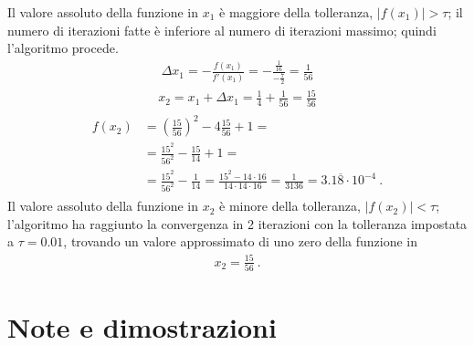 \documentclass[letterpaper,10pt,italian]{jupyterBook}
\begin{document}
\sphinxAtStartPar
Il valore assoluto della funzione in \(x_1\) è maggiore della tolleranza, \(|f(x_1)| > \tau\); il numero di iterazioni fatte è inferiore al numero di iterazioni massimo; quindi l’algoritmo procede.
\begin{equation*}
\begin{split}\Delta x_1 = - \frac{f(x_1)}{f'(x_1)} = -\frac{\frac{1}{16}}{-\frac{7}{2}} = \frac{1}{56}\end{split}
\end{equation*}\begin{equation*}
\begin{split}x_2 = x_1 + \Delta x_1 = \frac{1}{4} + \frac{1}{56} = \frac{15}{56}\end{split}
\end{equation*}
\sphinxAtStartPar
{}
\begin{equation*}
\begin{split}\begin{aligned}
   f(x_2) 
     & = \left(\frac{15}{56}\right)^2 - 4 \frac{15}{56} + 1 = \\
     & = \frac{15^2}{56^2} - \frac{15}{14} + 1 = \\
     & = \frac{15^2}{56^2} - \frac{1}{14} = 
     \frac{15^2 - 14 \cdot 16}{14 \cdot 14 \cdot 16} = \frac{1}{3136} = 3.1\overline{8} \cdot 10^{-4} \ .
\end{aligned}\end{split}
\end{equation*}
\sphinxAtStartPar
Il valore assoluto della funzione in \(x_2\) è minore della tolleranza, \(|f(x_2)| < \tau\); l’algoritmo ha raggiunto la convergenza in 2 iterazioni con la tolleranza impostata a \(\tau = 0.01\), trovando un valore approssimato di uno zero della funzione in
\begin{equation*}
\begin{split}x_2 = \frac{15}{56} \ .\end{split}
\end{equation*}
\sphinxstepscope


\section{Note e dimostrazioni}
\label{\detokenize{ch/infinitesimal_calculus/derivatives-notes:note-e-dimostrazioni}}\label{\detokenize{ch/infinitesimal_calculus/derivatives-notes:infinitesimal-calculus-derivatives-notes}}\label{\detokenize{ch/infinitesimal_calculus/derivatives-notes::doc}}
\end{document}
